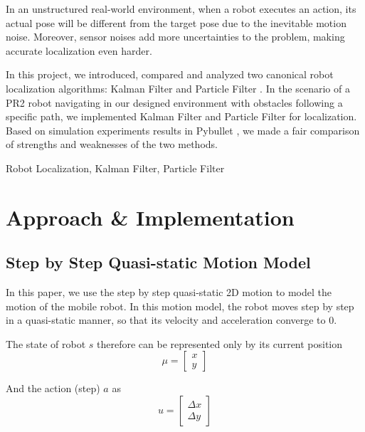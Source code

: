 \documentclass[conference,onecolumn]{IEEEtran}
\begin{document}
In an unstructured real-world environment, when a robot executes an action, its actual pose will be different from the target pose due to the inevitable motion noise. Moreover, sensor noises add more uncertainties to the problem, making accurate localization even harder. 

In this project, we introduced, compared and analyzed two canonical robot localization algorithms: Kalman Filter and Particle Filter \cite{welch1995introduction, stepanov2011kalman, del1997nonlinear}. In the scenario of a PR2 robot navigating in our designed environment with obstacles following a specific path, we implemented Kalman Filter and Particle Filter for localization. Based on simulation experiments results in Pybullet \cite{coumans2021},  we made a fair comparison of strengths and weaknesses of the two methods. 

\begin{IEEEkeywords}
\centering
Robot Localization, Kalman Filter, Particle Filter
\end{IEEEkeywords}


\section{Approach \& Implementation}

\subsection{Step by Step Quasi-static Motion Model}
In this paper, we use the step by step quasi-static 2D motion to model the motion of the mobile robot.
In this motion model, the robot moves step by step in a quasi-static manner, so that its velocity and acceleration converge to 0.

The state of robot $s$ therefore can be represented only by its current position
\begin{equation}
    \mu = \begin{bmatrix} 
    x \\
    y
    \end{bmatrix}
\end{equation}

And the action (step) $a$ as
\begin{equation}
    u = \begin{bmatrix} 
    \Delta x \\
    \Delta y
    \end{bmatrix}
\end{equation}
\end{document}
